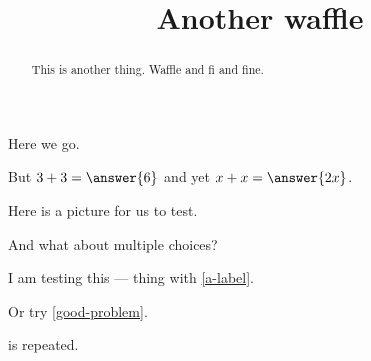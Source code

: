 \documentclass{ximera}
\title{Another waffle}
\begin{document}
\begin{abstract}
  This is another thing.  Waffle and fi and fine.
\end{abstract}
\maketitle

Here we go.

\begin{problem}
  But $3 + 3 = \answer{6}$ and yet $x + x = \answer{2x}$.
\end{problem}

Here is a picture for us to test.


And what about multiple choices?
\begin{problem}
\begin{multipleChoice}
\end{multipleChoice}
\end{problem}

I am testing this ---  thing with \ref{a-label}.

Or try \ref{good-problem}.

\begin{theorem}
  \label{thm:another}
\end{theorem}

\begin{corollary}
  \label{thm:whee} is repeated.
\end{corollary}
\end{document}
